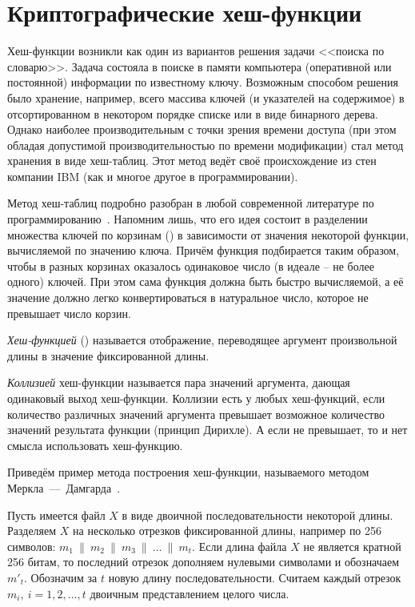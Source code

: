 \chapter{Криптографические хеш-функции}\label{chapter-hash-functions}

Хеш-функции возникли как один из вариантов решения задачи <<поиска по словарю>>. Задача состояла в поиске в памяти компьютера (оперативной или постоянной) информации по известному ключу. Возможным способом решения было хранение, например, всего массива ключей (и указателей на содержимое) в отсортированном в некотором порядке списке или в виде бинарного дерева. Однако наиболее производительным с точки зрения времени доступа (при этом обладая допустимой производительностью по времени модификации) стал метод хранения в виде хеш-таблиц. Этот метод ведёт своё происхождение из стен компании IBM (как и многое другое в программировании).

Метод хеш-таблиц подробно разобран в любой современной литературе по программированию~\cite{Knuth:2001:3}. Напомним лишь, что его идея состоит в разделении множества ключей по корзинам () в зависимости от значения некоторой функции, вычисляемой по значению ключа. Причём функция подбирается таким образом, чтобы в разных корзинах оказалось одинаковое число (в идеале -- не более одного) ключей. При этом сама функция должна быть быстро вычисляемой, а её значение должно легко конвертироваться в натуральное число, которое не превышает число корзин.

\emph{Хеш-функцией} () называется отображение, переводящее аргумент произвольной длины в значение фиксированной длины.

\emph{Коллизией} хеш-функции называется пара значений аргумента, дающая одинаковый выход хеш-функции. Коллизии есть у любых хеш-функций, если количество различных значений аргумента превышает возможное количество значений результата функции (принцип Дирихле). А если не превышает, то и нет смысла использовать хеш-функцию.

\example
Приведём пример метода построения хеш-функции, называемого методом Меркла~---~Дамгарда~\cite{Merkle:1979, Merkle:1990, Damgard:1990}.

Пусть имеется файл $X$ в виде двоичной последовательности некоторой длины. Разделяем $X$ на несколько отрезков фиксированной длины, например по 256 символов:  $m_{1} ~\|~ m_{2} ~\|~ m_{3} ~\|~ \ldots ~\|~ m_{t}$. Если длина файла $X$ не является кратной 256 битам, то последний отрезок дополняем нулевыми символами и обозначаем $m'_{t}$.
Обозначим за $t$ новую длину последовательности. Считаем каждый отрезок $m_i, ~ i = 1, 2, \dots, t$ двоичным представлением целого числа.

